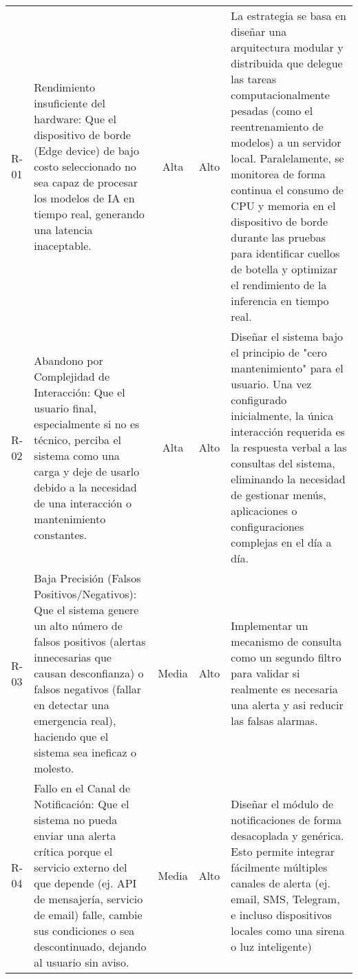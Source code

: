 \begin{longtable}[c]{c p{4cm} c c p{6cm}}
  R-01 & Rendimiento insuficiente del hardware: Que el dispositivo de borde (Edge device) de bajo costo seleccionado no sea capaz de procesar los modelos de IA en tiempo real, generando una latencia inaceptable.                                                        & Alta         & Alto    & La estrategia se basa en diseñar una arquitectura modular y distribuida que delegue las tareas computacionalmente pesadas (como el reentrenamiento de modelos) a un servidor local. Paralelamente, se monitorea de forma continua el consumo de CPU y memoria en el dispositivo de borde durante las pruebas para identificar cuellos de botella y optimizar el rendimiento de la inferencia en tiempo real.                                              \\
  \addlinespace
  R-02 & Abandono por Complejidad de Interacción: Que el usuario final, especialmente si no es técnico, perciba el sistema como una carga y deje de usarlo debido a la necesidad de una interacción o mantenimiento constantes.                                            & Alta         & Alto    & Diseñar el sistema bajo el principio de "cero mantenimiento" para el usuario. Una vez configurado inicialmente, la única interacción requerida es la respuesta verbal a las consultas del sistema, eliminando la necesidad de gestionar menús, aplicaciones o configuraciones complejas en el día a día.                                                                                                                                                  \\
  \addlinespace
  R-03 & Baja Precisión (Falsos Positivos/Negativos): Que el sistema genere un alto número de falsos positivos (alertas innecesarias que causan desconfianza) o falsos negativos (fallar en detectar una emergencia real), haciendo que el sistema sea ineficaz o molesto. & Media        & Alto    & Implementar un mecanismo de consulta como un segundo filtro para validar si realmente es necesaria una alerta y asi reducir las falsas alarmas.                                                                                                                                                                                                                                                                                                           \\
  \addlinespace
  R-04 & Fallo en el Canal de Notificación: Que el sistema no pueda enviar una alerta crítica porque el servicio externo del que depende (ej. API de mensajería, servicio de email) falle, cambie sus condiciones o sea descontinuado, dejando al usuario sin aviso.       & Media        & Alto    & Diseñar el módulo de notificaciones de forma desacoplada y genérica. Esto permite integrar fácilmente múltiples canales de alerta (ej. email, SMS, Telegram, e incluso dispositivos locales como una sirena o luz inteligente)                                                                                                                                                                                                                            \\

\end{longtable}

